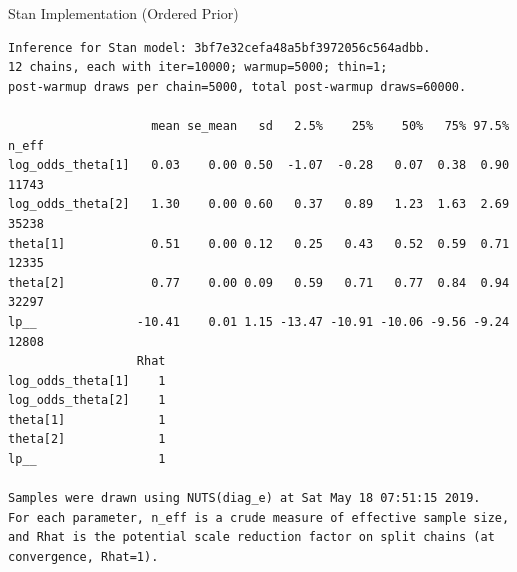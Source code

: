 \documentclass[dvipdfmx,bigger,aspectratio=169]{beamer}
\begin{document}
\begin{frame}[fragile,allowframebreaks,label=,t]{Stan Implementation (Ordered Prior)}
\normalsize
\scriptsize
\normalsize
\scriptsize
\begin{verbatim}
Inference for Stan model: 3bf7e32cefa48a5bf3972056c564adbb.
12 chains, each with iter=10000; warmup=5000; thin=1; 
post-warmup draws per chain=5000, total post-warmup draws=60000.

                    mean se_mean   sd   2.5%    25%    50%   75% 97.5% n_eff
log_odds_theta[1]   0.03    0.00 0.50  -1.07  -0.28   0.07  0.38  0.90 11743
log_odds_theta[2]   1.30    0.00 0.60   0.37   0.89   1.23  1.63  2.69 35238
theta[1]            0.51    0.00 0.12   0.25   0.43   0.52  0.59  0.71 12335
theta[2]            0.77    0.00 0.09   0.59   0.71   0.77  0.84  0.94 32297
lp__              -10.41    0.01 1.15 -13.47 -10.91 -10.06 -9.56 -9.24 12808
                  Rhat
log_odds_theta[1]    1
log_odds_theta[2]    1
theta[1]             1
theta[2]             1
lp__                 1

Samples were drawn using NUTS(diag_e) at Sat May 18 07:51:15 2019.
For each parameter, n_eff is a crude measure of effective sample size,
and Rhat is the potential scale reduction factor on split chains (at 
convergence, Rhat=1).
\end{verbatim}

\normalsize
\end{frame}
\end{document}
